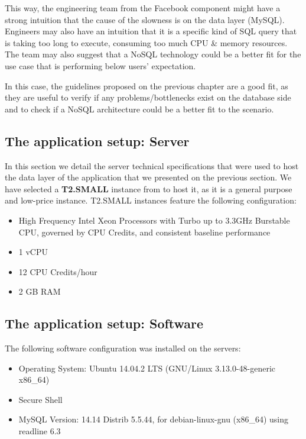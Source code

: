 This way, the engineering team from the Facebook component might have a strong intuition that the cause of the slowness is on the data layer (MySQL). Engineers may also have an intuition that it is a specific kind of SQL query that is taking too long to execute, consuming too much CPU \& memory resources. The team may also suggest that a NoSQL technology could be a better fit for the use case that is performing below users' expectation. 

In this case, the guidelines proposed on the previous chapter are a good fit, as they are useful to verify if any problems/bottlenecks exist on the database side and to check if a NoSQL architecture could be a better fit to the scenario.


\subsection{The application setup: Server}
\label{appserver}
In this section we detail the server technical specifications that were used to host the data layer of the application that we presented on the previous section. We have selected a \textbf{T2.SMALL} instance from \cite{amazonec2} to host it, as it is a general purpose and low-price instance. T2.SMALL instances feature the following configuration:

\begin{itemize}
\item{High Frequency Intel Xeon Processors with Turbo up to 3.3GHz Burstable CPU, governed by CPU Credits, and consistent baseline performance}
\item{1 vCPU}
\item{12 CPU Credits/hour}
\item{2 GB RAM}
\end{itemize}

\subsection{The application setup: Software}
The following software configuration was installed on the servers: 

\begin{itemize}
\item{Operating System: Ubuntu 14.04.2 LTS (GNU/Linux 3.13.0-48-generic x86\_64)}
\item{Secure Shell}
\item{MySQL Version: 14.14 Distrib 5.5.44, for debian-linux-gnu (x86\_64) using readline 6.3}
\end{itemize}

